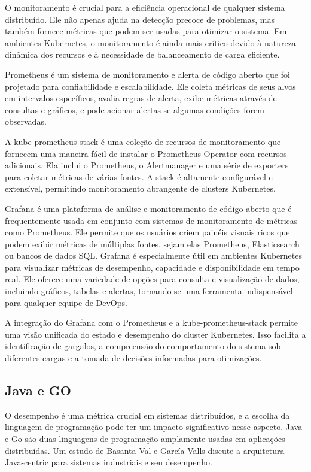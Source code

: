 O monitoramento é crucial para a eficiência operacional de qualquer sistema distribuído. Ele não apenas ajuda na detecção precoce de problemas, mas também fornece métricas que podem ser usadas para otimizar o sistema. Em ambientes Kubernetes, o monitoramento é ainda mais crítico devido à natureza dinâmica dos recursos e à necessidade de balanceamento de carga eficiente\cite{epjconf202125102004}.

Prometheus é um sistema de monitoramento e alerta de código aberto que foi projetado para confiabilidade e escalabilidade. Ele coleta métricas de seus alvos em intervalos específicos, avalia regras de alerta, exibe métricas através de consultas e gráficos, e pode acionar alertas se algumas condições forem observadas\cite{epjconf202125102004}.

A kube-prometheus-stack é uma coleção de recursos de monitoramento que fornecem uma maneira fácil de instalar o Prometheus Operator com recursos adicionais. Ela inclui o Prometheus, o Alertmanager e uma série de exporters para coletar métricas de várias fontes. A stack é altamente configurável e extensível, permitindo monitoramento abrangente de clusters Kubernetes\cite{realtime2023edge}.

Grafana é uma plataforma de análise e monitoramento de código aberto que é frequentemente usada em conjunto com sistemas de monitoramento de métricas como Prometheus. Ele permite que os usuários criem painéis visuais ricos que podem exibir métricas de múltiplas fontes, sejam elas Prometheus, Elasticsearch ou bancos de dados SQL. Grafana é especialmente útil em ambientes Kubernetes para visualizar métricas de desempenho, capacidade e disponibilidade em tempo real. Ele oferece uma variedade de opções para consulta e visualização de dados, incluindo gráficos, tabelas e alertas, tornando-se uma ferramenta indispensável para qualquer equipe de DevOps\cite{epjconf202125102004}.

A integração do Grafana com o Prometheus e a kube-prometheus-stack permite uma visão unificada do estado e desempenho do cluster Kubernetes. Isso facilita a identificação de gargalos, a compreensão do comportamento do sistema sob diferentes cargas e a tomada de decisões informadas para otimizações\cite{realtime2023edge}.

\subsection{Java e GO}

O desempenho é uma métrica crucial em sistemas distribuídos, e a escolha da linguagem de programação pode ter um impacto significativo nesse aspecto. Java e Go são duas linguagens de programação amplamente usadas em aplicações distribuídas. Um estudo de Basanta-Val e García-Valls discute a arquitetura Java-centric para sistemas industriais e seu desempenho\cite{basanta2014java}.

